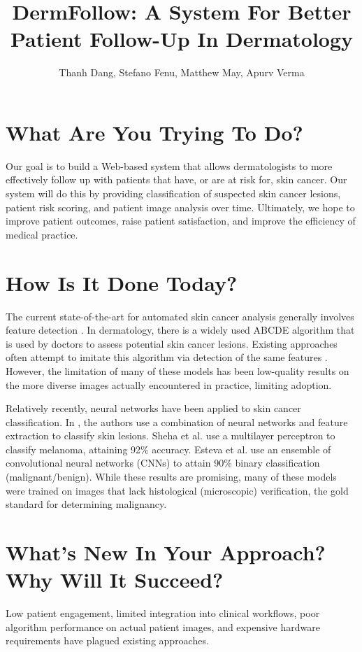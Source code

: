 \documentclass[a4paper,12pt]{article}
\title{DermFollow: A System For Better Patient Follow-Up In Dermatology}
\author{Thanh Dang, Stefano Fenu, Matthew May, Apurv Verma}
\begin{document}
\maketitle

\section{What Are You Trying To Do?}
Our goal is to build a Web-based system that allows dermatologists to more
effectively follow up with patients that have, or are at risk for, skin cancer.
Our system will do this by providing classification of suspected skin cancer
lesions, patient risk scoring, and patient image analysis over time. Ultimately,
we hope to improve patient outcomes, raise patient satisfaction, and improve
the efficiency of medical practice.

\section{How Is It Done Today?}
The current state-of-the-art for automated skin cancer analysis generally
involves feature detection \cite{DBLP:journals/eswa/LeeC15}. In dermatology,
there is a widely used ABCDE \cite{thomas1998semiological} algorithm that is
used by doctors to assess potential skin cancer lesions. Existing approaches
often attempt to imitate this algorithm via detection of the same features
\cite{zagrouba2004prelimary}. However, the limitation of many of these models
has been low-quality results on the more diverse images actually encountered
in practice, limiting adoption.

Relatively recently, neural networks have been applied to skin cancer
classification. In \cite{Kreutz2001}, the authors use a combination of neural
networks and feature extraction to classify skin lesions. Sheha et al.
\cite{Sheha_automaticdetection} use a multilayer perceptron to classify
melanoma, attaining 92\% accuracy. Esteva et al.
\cite{esteva-skincancer-manuscript} use an ensemble of convolutional neural
networks (CNNs) to attain 90\% binary classification (malignant/benign).
While these results are promising, many of these models were trained on images
that lack histological (microscopic) verification, the gold standard for
determining malignancy.

\section{What's New In Your Approach? Why Will It Succeed?}
Low patient engagement, limited integration into clinical workflows, poor
algorithm performance on actual patient images, and expensive hardware
requirements have plagued existing approaches.
\end{document}

